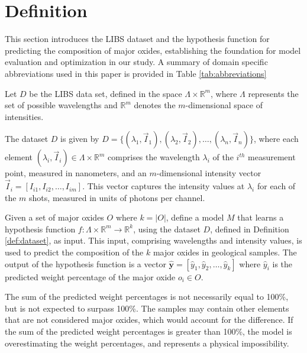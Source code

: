 \section{Definition}\label{sec:definition}
This section introduces the LIBS dataset and the hypothesis function for predicting the composition of major oxides, establishing the foundation for model evaluation and optimization in our study.
A summary of domain specific abbreviations used in this paper is provided in Table \ref{tab:abbreviations}

\begin{definition}\label{def:dataset}
    Let $D$ be the LIBS data set, defined in the space $\Lambda \times \mathbb{R}^m$, where $\Lambda$ represents the set of possible wavelengths and $\mathbb{R}^m$ denotes the $m$-dimensional space of intensities.

    The dataset $D$ is given by $D = \{ (\lambda_1, \vec{I}_1), (\lambda_2, \vec{I}_2), \ldots, (\lambda_n, \vec{I}_n) \}$, where each element $(\lambda_i, \vec{I}_i) \in \Lambda \times \mathbb{R}^{m}$ comprises the wavelength $\lambda_i$ of the $i^{th}$ measurement point, measured in nanometers, and an $m$-dimensional intensity vector $\vec{I}_i = [I_{i1}, I_{i2}, \ldots, I_{im}]$.
    This vector captures the intensity values at $\lambda_i$ for each of the $m$ shots, measured in units of photons per channel.
\end{definition}

\begin{definition}\label{def:hypothesis_function}
    Given a set of major oxides \(O\) where \(k=|O|\), define a model \(M\) that learns a hypothesis function \(f: \Lambda \times \mathbb{R}^m \rightarrow \mathbb{R}^k\), using the dataset \(D\), defined in Definition \ref{def:dataset}, as input.
    This input, comprising wavelengths and intensity values, is used to predict the composition of the \(k\) major oxides in geological samples.
    The output of the hypothesis function is a vector \(\mathbf{\hat{y}} = [\hat{y}_{1}, \hat{y}_{2}, \ldots, \hat{y}_{k}]\) where \(\hat{y}_{i}\) is the predicted weight percentage of the major oxide \(o_i \in O\).
\end{definition}

The sum of the predicted weight percentages is not necessarily equal to 100\%, but is not expected to surpass 100\%.
The samples may contain other elements that are not considered major oxides, which would account for the difference.
If the sum of the predicted weight percentages is greater than 100\%, the model is overestimating the weight percentages, and represents a physical impossibility.

